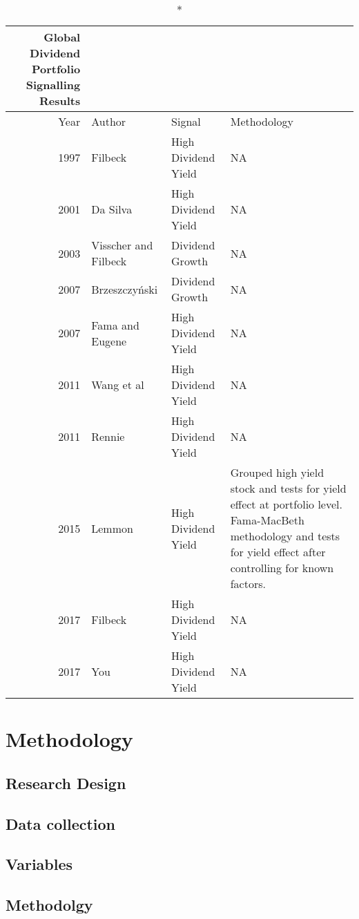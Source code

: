 \documentclass[11pt,preprint, authoryear]{elsarticle}
\numberwithin{equation}{section}
\numberwithin{figure}{section}
\numberwithin{table}{section}
\begin{document}
\begin{longtable}{rlll}
\caption*{
{\large Global Dividend Portfolio Signalling Results}
} \\ 
\toprule
Year & Author & Signal & Methodology \\ 
\midrule
1997 & Filbeck & High Dividend Yield & NA \\ 
2001 & Da Silva & High Dividend Yield & NA \\ 
2003 & Visscher and Filbeck & Dividend Growth & NA \\ 
2007 & Brzeszczyński & Dividend Growth & NA \\ 
2007 & Fama and Eugene & High Dividend Yield & NA \\ 
2011 & Wang et al & High Dividend Yield & NA \\ 
2011 & Rennie & High Dividend Yield & NA \\ 
2015 & Lemmon & High Dividend Yield & Grouped high yield stock and tests for yield effect at portfolio level.  Fama-MacBeth methodology and tests for yield effect after controlling for known factors. \\ 
2017 & Filbeck & High Dividend Yield & NA \\ 
2017 & You & High Dividend Yield & NA \\ 
\bottomrule
\end{longtable}

\newpage

\hypertarget{methodology}{%
\section{Methodology}\label{methodology}}

\hypertarget{research-design}{%
\subsection{Research Design}\label{research-design}}

\hypertarget{data-collection}{%
\subsection{Data collection}\label{data-collection}}

\hypertarget{variables}{%
\subsection{Variables}\label{variables}}

\hypertarget{methodolgy}{%
\subsection{Methodolgy}\label{methodolgy}}
\end{document}
